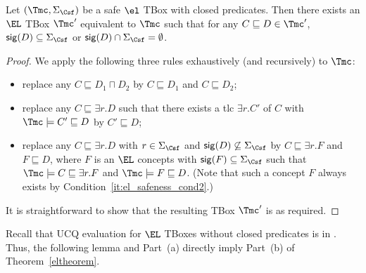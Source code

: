 \documentclass{lmcs}
\theoremstyle{definition}
\begin{document}
\begin{lem}\label{lem:independent}
  Let $(\Tmc,\Sigma_\Csf)$ be a safe $\el$ TBox with closed predicates. 
  Then there exists an $\EL$ TBox $\Tmc'$
  equivalent to $\Tmc$ such that for any $C \sqsubseteq D \in
  \Tmc'$, ${\sf sig}(D) \subseteq \Sigma_\Csf$ or ${\sf sig}(D) \cap
  \Sigma_\Csf=\emptyset$.
\end{lem}
\begin{proof}
We apply the following three rules exhaustively (and recursively) to $\Tmc$:
  \begin{itemize}
  \item replace any $C\sqsubseteq D_{1}\sqcap D_{2}$ by $C\sqsubseteq D_{1}$ and $C\sqsubseteq D_{2}$;
  \item replace any $C \sqsubseteq \exists r.D$ such that there exists a tlc $\exists r.C'$ of
    $C$ with $\Tmc\models C' \sqsubseteq D$ by $C'\sqsubseteq D$;
  \item replace any $C \sqsubseteq \exists r.D$ with $r\in \Sigma_\Csf$ and ${\sf
      sig}(D)\not\subseteq \Sigma_\Csf$ by $C \sqsubseteq \exists r.F$ and
    $F\sqsubseteq D$, where $F$ is an
    $\EL$ concepts with ${\sf sig}(F)\subseteq \Sigma_{\Csf}$ such that $\Tmc\models C \sqsubseteq \exists r.F$ and
    $\Tmc\models F \sqsubseteq D$. (Note that such a concept $F$ always exists by Condition~\ref{it:el_safeness_cond2}.)
  \end{itemize}
  It is straightforward to show that the resulting TBox $\Tmc'$ is as required.
\end{proof}

Recall that UCQ evaluation for $\EL$ TBoxes without closed predicates is in \ptime. 
Thus, the following lemma and Part~(a) directly imply Part~(b) of Theorem~\ref{eltheorem}.
\end{document}
